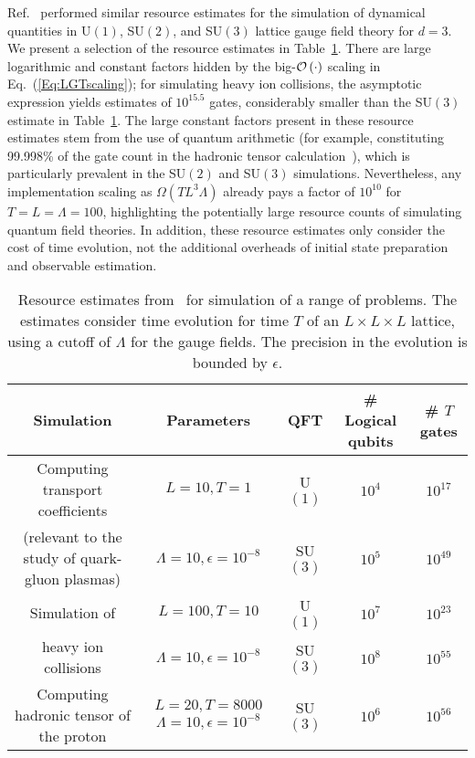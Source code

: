 \begin{refsection}
Ref.~\cite{kan2021lattice} performed similar resource estimates for the simulation of dynamical quantities in U$(1)$, SU$(2)$, and SU$(3)$ lattice gauge field theory for $d=3$. We present a selection of the resource estimates in Table~\ref{tab:QFTestimates}. There are large logarithmic and constant factors hidden by the big-$\mathcal{O}\left( \cdot \right)$ scaling in Eq.~(\ref{Eq:LGTscaling}); for simulating heavy ion collisions, the asymptotic expression yields estimates of $10^{15.5}$ gates, considerably smaller than the SU$(3)$ estimate in Table~\ref{tab:QFTestimates}. The large constant factors present in these resource estimates stem from the use of quantum arithmetic (for example, constituting 99.998\% of the gate count in the hadronic tensor calculation~\cite{kan2021lattice}), which is particularly prevalent in the SU$(2)$ and SU$(3)$ simulations. Nevertheless, any implementation scaling as $\Omega(TL^3 \Lambda)$ already pays a factor of $10^{10}$ for $T=L=\Lambda=100$, highlighting the potentially large resource counts of simulating quantum field theories. In addition, these resource estimates only consider the cost of time evolution, not the additional overheads of initial state preparation and observable estimation. 


\begin{table}[!h]
    \centering
    \begin{adjustbox}{max width=\textwidth}
    \begin{tabular}{c|c|c|c|c}
        
        \textbf{Simulation} & \textbf{Parameters} & \textbf{QFT} & \textbf{\# Logical qubits} & \textbf{\# $T$ gates} \\ \hline \hline
        Computing transport coefficients & $L=10, T=1$ & U$(1)$ & $10^4$ & $10^{17}$  \\ 
        (relevant to the study of quark-gluon plasmas) & $\Lambda=10, \epsilon=10^{-8}$ & SU$(3)$ & $10^5$ &  $10^{49}$ \\ \hline
        Simulation of & $L=100, T=10$ & U$(1)$ & $10^7$ & $10^{23}$  \\ 
        heavy ion collisions & $\Lambda=10, \epsilon=10^{-8}$ & SU$(3)$ & $10^8$ &  $10^{55}$ \\ \hline
        Computing hadronic tensor of the proton & \makecell{$L=20, T=8000$ \\ $\Lambda=10, \epsilon=10^{-8}$} & SU$(3)$ & $10^6$ & $10^{56}$  \\ 
    \end{tabular}
    \end{adjustbox}
    \caption{Resource estimates from~\cite{kan2021lattice} for simulation of a range of problems. The estimates consider time evolution for time $T$ of an $L \times L \times L$ lattice, using a cutoff of $\Lambda$ for the gauge fields. The precision in the evolution is bounded by $\epsilon$. }
    \label{tab:QFTestimates}
\end{table}





\end{refsection}
